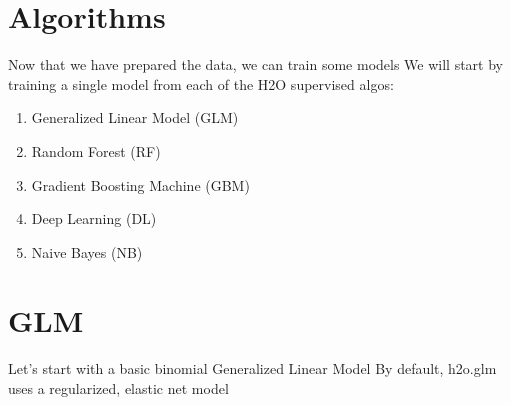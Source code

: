 \documentclass[]{book}
\newenvironment{Shaded}{\begin{snugshade}}{\end{snugshade}}
\newcommand{\CommentTok}[1]{\textcolor[rgb]{0.56,0.35,0.01}{\textit{#1}}}
\newcommand{\DataTypeTok}[1]{\textcolor[rgb]{0.13,0.29,0.53}{#1}}
\newcommand{\DecValTok}[1]{\textcolor[rgb]{0.00,0.00,0.81}{#1}}
\newcommand{\ErrorTok}[1]{\textcolor[rgb]{0.64,0.00,0.00}{\textbf{#1}}}
\newcommand{\KeywordTok}[1]{\textcolor[rgb]{0.13,0.29,0.53}{\textbf{#1}}}
\newcommand{\NormalTok}[1]{#1}
\newcommand{\OperatorTok}[1]{\textcolor[rgb]{0.81,0.36,0.00}{\textbf{#1}}}
\newcommand{\StringTok}[1]{\textcolor[rgb]{0.31,0.60,0.02}{#1}}
\providecommand{\tightlist}{%
  \setlength{\itemsep}{0pt}\setlength{\parskip}{0pt}}
\begin{document}
\hypertarget{algorithms}{%
\section{Algorithms}\label{algorithms}}

Now that we have prepared the data, we can train some models
We will start by training a single model from each of the H2O supervised algos:

\begin{enumerate}
\def\labelenumi{\arabic{enumi}.}
\tightlist
\item
  Generalized Linear Model (GLM)
\item
  Random Forest (RF)
\item
  Gradient Boosting Machine (GBM)
\item
  Deep Learning (DL)
\item
  Naive Bayes (NB)
\end{enumerate}

\hypertarget{glm}{%
\section{GLM}\label{glm}}

Let's start with a basic binomial Generalized Linear Model
By default, h2o.glm uses a regularized, elastic net model

\begin{Shaded}
\end{Shaded}
\end{document}
